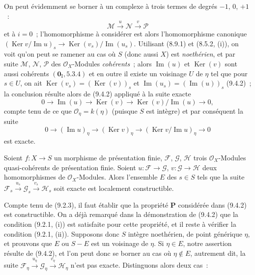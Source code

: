 
On peut évidemment se borner à un complexe à trois termes de degrés
$-1$, $0$, $+1$~:
\[
\mathcal M\xrightarrow{u}\mathcal N\xrightarrow{v}\mathcal P
\]
et à $i=0$~; l'homomorphisme à considérer est alors l'homomorphisme canonique
$(\operatorname{Ker}v/\operatorname{Im}u)_s\to
\operatorname{Ker}(v_s)/\operatorname{Im}(u_s)$. Utilisant (8.9.1) et
(8.5.2, (i)), on voit qu'on peut se ramener au cas où $S$ (donc aussi $X$)
est \emph{noethérien}, et par suite $\mathcal M$, $\mathcal N$, $\mathcal P$
des $\mathcal O_X$-Modules \emph{cohérents}~; alors
$\operatorname{Im}(u)$ et $\operatorname{Ker}(v)$ sont aussi cohérents
$(\mathbf 0_{\mathrm I},5.3.4)$ et en outre il existe un voisinage $U$ de
$\eta$ tel que pour $s\in U$, on ait
$\operatorname{Ker}(v_s)=(\operatorname{Ker}(v))_s$ et
$\operatorname{Im}(u_s)=(\operatorname{Im}(u))_s$ (9.4.2)~; la conclusion
résulte alors de (9.4.2) appliqué à la suite exacte
\[
0\to\operatorname{Im}(u)\to\operatorname{Ker}(v)\to
\operatorname{Ker}(v)/\operatorname{Im}(u)\to0,
\]
compte tenu de ce que $\mathcal O_\eta=k(\eta)$ (puisque $S$ est intègre) et
par conséquent la suite
\[
0\to(\operatorname{Im}u)_\eta\to(\operatorname{Ker}v)_\eta\to
(\operatorname{Ker}v/\operatorname{Im}u)_\eta\to0
\]
est exacte.

\begin{proposition}[9.4.4]
\label{IV.9.4.4-fr}
Soient $f:X\to S$ un morphisme de présentation finie, $\mathcal F$,
$\mathcal G$, $\mathcal H$ trois $\mathcal O_X$-Modules quasi-cohérents de
présentation finie. Soient $u:\mathcal F\to\mathcal G$,
$v:\mathcal G\to\mathcal H$ deux homomorphismes de $\mathcal O_X$-Modules.
Alors l'ensemble $E$ des $s\in S$ tels que la suite
$\mathcal F_s\xrightarrow{u_s}\mathcal G_s
\xrightarrow{v_s}\mathcal H_s$ soit exacte est localement constructible.
\end{proposition}

Compte tenu de (9.2.3), il faut établir que la propriété $\mathbf P$ considérée
dans (9.4.2) est constructible. On a déjà remarqué dans la démonstration de
(9.4.2) que la condition (9.2.1, (i)) est satisfaite pour cette propriété, et
il reste à vérifier la condition (9.2.1, (ii)). Supposons donc $S$ intègre
noethérien, de point générique $\eta$, et prouvons que $E$ ou $S-E$ est un
voisinage de $\eta$. Si $\eta\in E$, notre assertion résulte de (9.4.2), et
l'on peut donc se borner au cas où $\eta\notin E$, autrement dit, la suite
$\mathcal F_\eta\xrightarrow{u_\eta}\mathcal G_\eta
\xrightarrow{v_\eta}\mathcal H_\eta$ n'est pas exacte. Distinguons alors
deux cas~:

